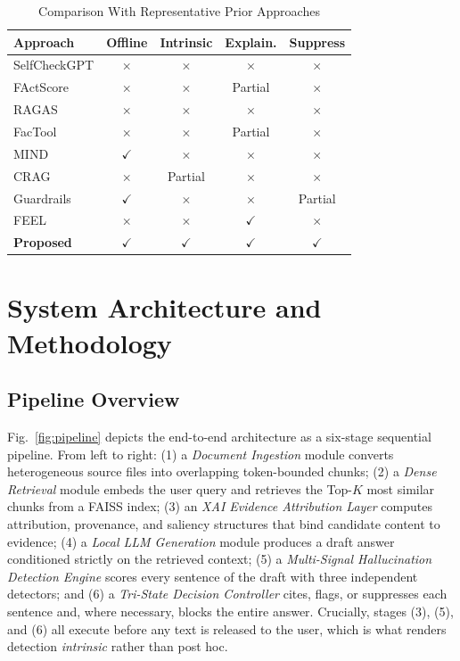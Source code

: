 \documentclass[journal]{IEEEtran}
\begin{document}
\begin{table}[!t]
\caption{Comparison With Representative Prior Approaches}
\label{tab:related}
\centering
\small
\begin{tabular}{@{}lcccc@{}}
\toprule
Approach & Offline & Intrinsic & Explain. & Suppress \\
\midrule
SelfCheckGPT \cite{manakul2023selfcheckgpt} & $\times$ & $\times$ & $\times$ & $\times$ \\
FActScore \cite{min2023factscore} & $\times$ & $\times$ & Partial & $\times$ \\
RAGAS \cite{es2024ragas} & $\times$ & $\times$ & $\times$ & $\times$ \\
FacTool \cite{pan2023factool} & $\times$ & $\times$ & Partial & $\times$ \\
MIND \cite{su2024mind} & $\checkmark$ & $\times$ & $\times$ & $\times$ \\
CRAG \cite{yan2024crag} & $\times$ & Partial & $\times$ & $\times$ \\
Guardrails \cite{mishra2025guardrails} & $\checkmark$ & $\times$ & $\times$ & Partial \\
FEEL \cite{zhang2024feel} & $\times$ & $\times$ & $\checkmark$ & $\times$ \\
\textbf{Proposed} & $\checkmark$ & $\checkmark$ & $\checkmark$ & $\checkmark$ \\
\bottomrule
\end{tabular}
\end{table}

\section{System Architecture and Methodology}

\subsection{Pipeline Overview}
Fig.~\ref{fig:pipeline} depicts the end-to-end architecture as a six-stage
sequential pipeline. From left to right: (1) a \emph{Document Ingestion}
module converts heterogeneous source files into overlapping token-bounded
chunks; (2) a \emph{Dense Retrieval} module embeds the user query and
retrieves the Top-$K$ most similar chunks from a FAISS index; (3) an
\emph{XAI Evidence Attribution Layer} computes attribution, provenance, and
saliency structures that bind candidate content to evidence; (4) a
\emph{Local LLM Generation} module produces a draft answer conditioned
strictly on the retrieved context; (5) a \emph{Multi-Signal Hallucination
Detection Engine} scores every sentence of the draft with three independent
detectors; and (6) a \emph{Tri-State Decision Controller} cites, flags, or
suppresses each sentence and, where necessary, blocks the entire answer.
Crucially, stages (3), (5), and (6) all execute before any text is released
to the user, which is what renders detection \emph{intrinsic} rather than
post hoc.
\end{document}

